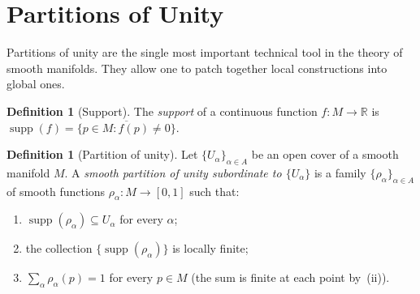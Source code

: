 \documentclass[12pt,a4paper,openany]{book}
\theoremstyle{definition}
\newtheorem{definition}[theorem]{Definition}
\theoremstyle{remark}
\newcommand{\R}{\mathbb{R}}
\begin{document}
\begin{center}
\label{fig:boundary-chart}
\end{center}

\section{Partitions of Unity}
\label{sec:partitions-unity}

Partitions of unity are the single most important
technical tool in the theory of smooth manifolds.  They allow one to patch
together local constructions into global ones.

\begin{definition}[Support]\label{def:support}
The \emph{support} of a continuous function $f \colon M \to \R$ is
$\operatorname{supp}(f) = \overline{\{p \in M : f(p) \neq 0\}}$.
\end{definition}

\begin{definition}[Partition of unity]\label{def:partition-unity}
Let $\{U_\alpha\}_{\alpha \in A}$ be an open cover of a smooth manifold
$M$.  A \emph{smooth partition of unity subordinate to $\{U_\alpha\}$} is a
family $\{\rho_\alpha\}_{\alpha \in A}$ of smooth functions
$\rho_\alpha \colon M \to [0,1]$ such that:
\begin{enumerate}[label=(\roman*)]
  \item $\operatorname{supp}(\rho_\alpha) \subseteq U_\alpha$ for every
        $\alpha$;
  \item the collection $\{\operatorname{supp}(\rho_\alpha)\}$ is locally
        finite;
  \item $\sum_{\alpha} \rho_\alpha(p) = 1$ for every $p \in M$ (the sum
        is finite at each point by~(ii)).
\end{enumerate}
\end{definition}
\end{document}

